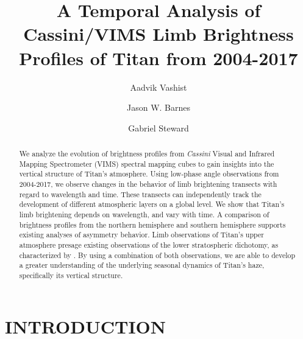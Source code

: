 \documentclass[tighten,linenumbers,twocolumn]{aastex631}
\begin{document}
\title{A Temporal Analysis of Cassini/VIMS Limb Brightness Profiles of Titan from 2004-2017
}
\author[0000-0002-6318-7226]{Aadvik Vashist}
\author[0000-0002-7755-3530]{Jason W. Barnes}
\author[0000-0002-8482-4669]{Gabriel Steward}





\begin{abstract}
We analyze the evolution of brightness profiles from \textit{Cassini} Visual and Infrared Mapping Spectrometer (VIMS) spectral mapping cubes to gain insights into the vertical structure of Titan's atmosphere. Using low-phase angle observations from 2004-2017, we observe changes in the behavior of limb brightening transects with regard to wavelength and time. These transects can independently track the development of different atmospheric layers on a global level. We show that Titan's limb brightening depends on wavelength, and vary with time. A comparison of brightness profiles from the northern hemisphere and southern hemisphere supports existing analyses of asymmetry behavior. Limb observations of Titan's upper atmosphere presage existing observations of the lower stratospheric dichotomy, as characterized by \cite{vashist2023titan}. By using a combination of both observations, we are able to develop a greater understanding of the underlying seasonal dynamics of Titan's haze, specifically its vertical structure.

\end{abstract}



\section{INTRODUCTION}

\end{document}
